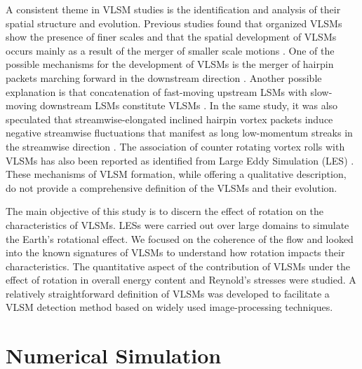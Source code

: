 A consistent theme in VLSM studies is the identification and analysis of their spatial structure and evolution. Previous studies found that organized  VLSMs show the presence of finer scales and that the spatial development of VLSMs occurs mainly as a result of the merger of smaller scale motions \cite{Lee_sung_jfm11,baltzer_jfm_13,lee_sung_jfm_14}. One of the possible mechanisms for the development of VLSMs is the merger of  hairpin packets marching forward in the downstream direction \cite{Lee_sung_jfm11}. Another possible  explanation is that concatenation of fast-moving upstream LSMs with slow-moving downstream LSMs constitute VLSMs \cite{lee_sung_jfm_14}. In the same study, it was also speculated that streamwise-elongated inclined hairpin vortex packets induce negative streamwise fluctuations that manifest as long low-momentum streaks in the streamwise direction \cite{lee_sung_jfm_14}. The association of counter rotating vortex rolls with VLSMs has also been reported as identified from Large Eddy Simulation (LES) \cite{fang2015blm}.  These  mechanisms of VLSM formation, while offering a qualitative description, do not provide a comprehensive definition of the VLSMs and their evolution.
 
The main objective of this study is to discern the effect of rotation on the characteristics of VLSMs.  LESs were carried out over large domains to simulate the Earth's rotational effect.  We focused on the coherence of the flow and looked into the  known  signatures of VLSMs to understand how rotation impacts their characteristics.  The quantitative aspect of the contribution of VLSMs under the effect of rotation  in overall energy content and  Reynold's stresses were studied.  A relatively straightforward  definition of VLSMs was developed to facilitate a VLSM detection method based on widely used image-processing techniques. 

\section{Numerical Simulation}
\label{sec:num_sim_chap_1}

